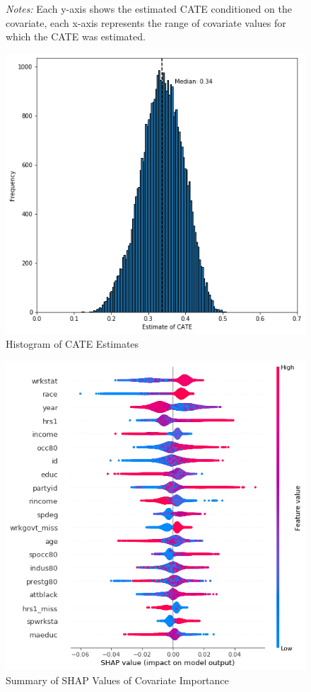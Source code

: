 \documentclass[12pt]{article}
\begin{document}
\begin{figure}[!htp]
{\begin{subfigure} [h] {0.45\linewidth}
		\vspace{0.5cm}
	\end{subfigure}}
\footnotesize
\emph{Notes:}  Each y-axis shows the estimated CATE conditioned on the covariate, each x-axis represents the range of covariate values for which the CATE was estimated.
\end{figure} 

\begin{figure}[!htp]
\caption{Histogram of CATE Estimates}
	\centering
   	 	\includegraphics[width = 0.6\linewidth]{Graphs/s1_catefreq.png}
\end{figure} 

\begin{figure}[!htp]
\caption{Summary of SHAP Values of Covariate Importance}
	\centering
   	 	\includegraphics[width = 0.6\linewidth]{Graphs/s1_shap.png}
\end{figure} 
\end{document}
